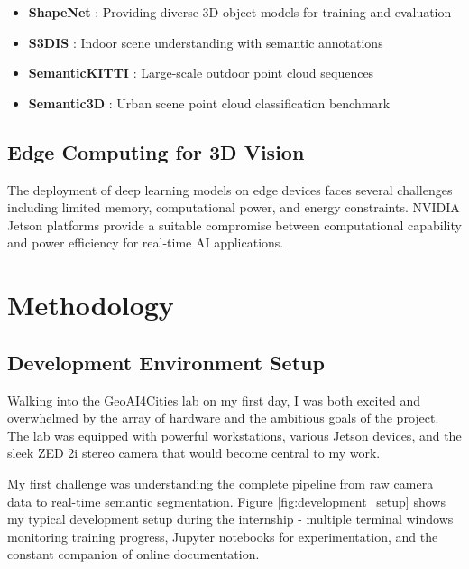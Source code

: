 \documentclass[12pt,a4paper]{report}
\begin{document}
\begin{itemize}
    \item \textbf{ShapeNet} \cite{chang2015shapenet}: Providing diverse 3D object models for training and evaluation
    \item \textbf{S3DIS} \cite{armeni2016s3dis}: Indoor scene understanding with semantic annotations
    \item \textbf{SemanticKITTI} \cite{behley2019semantickitti}: Large-scale outdoor point cloud sequences
    \item \textbf{Semantic3D} \cite{hackel2017semantic3d}: Urban scene point cloud classification benchmark
\end{itemize}

\section{Edge Computing for 3D Vision}

The deployment of deep learning models on edge devices faces several challenges including limited memory, computational power, and energy constraints. NVIDIA Jetson platforms provide a suitable compromise between computational capability and power efficiency for real-time AI applications.

\chapter{Methodology}

\section{Development Environment Setup}

Walking into the GeoAI4Cities lab on my first day, I was both excited and overwhelmed by the array of hardware and the ambitious goals of the project. The lab was equipped with powerful workstations, various Jetson devices, and the sleek ZED 2i stereo camera that would become central to my work.

My first challenge was understanding the complete pipeline from raw camera data to real-time semantic segmentation. Figure \ref{fig:development_setup} shows my typical development setup during the internship - multiple terminal windows monitoring training progress, Jupyter notebooks for experimentation, and the constant companion of online documentation.
\end{document}
